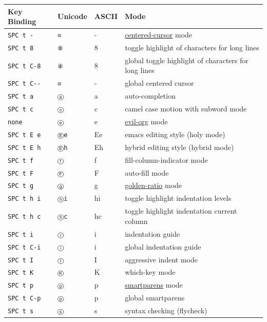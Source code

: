 \documentclass[11pt]{article}
\begin{document}
\begin{enumerate}
\begin{center}
\begin{tabular}{llll}
Key Binding & Unicode & ASCII & Mode\\
\hline
\texttt{SPC t -} & \texttt{⊝} & - & \href{http://emacswiki.org/emacs/centered-cursor-mode.el}{centered-cursor}  mode\\
\texttt{SPC t 8} & \texttt{⑧} & 8 & toggle highlight of characters for long lines\\
\texttt{SPC t C-8} & \texttt{⑧} & 8 & global toggle highlight of characters for long lines\\
\texttt{SPC t C-{}-} & \texttt{⊝} & - & global centered cursor\\
\texttt{SPC t a} & \texttt{ⓐ} & a & auto-completion\\
\texttt{SPC t c} & \texttt{ⓒ} & c & camel case motion with subword mode\\
\texttt{none} & \texttt{ⓔ} & e & \href{https://github.com/edwtjo/evil-org-mode}{evil-org} mode\\
\texttt{SPC t E e} & \texttt{Ⓔe} & Ee & emacs editing style (holy mode)\\
\texttt{SPC t E h} & \texttt{Ⓔh} & Eh & hybrid editing style (hybrid mode)\\
\texttt{SPC t f} & \texttt{ⓕ} & f & fill-column-indicator mode\\
\texttt{SPC t F} & \texttt{Ⓕ} & F & auto-fill mode\\
\texttt{SPC t g} & \texttt{ⓖ} & g & \href{https://github.com/roman/golden-ratio.el}{golden-ratio} mode\\
\texttt{SPC t h i} & \texttt{ⓗi} & hi & toggle highlight indentation levels\\
\texttt{SPC t h c} & \texttt{ⓗc} & hc & toggle highlight indentation current column\\
\texttt{SPC t i} & \texttt{ⓘ} & i & indentation guide\\
\texttt{SPC t C-i} & \texttt{ⓘ} & i & global indentation guide\\
\texttt{SPC t I} & \texttt{Ⓘ} & I & aggressive indent mode\\
\texttt{SPC t K} & \texttt{Ⓚ} & K & which-key mode\\
\texttt{SPC t p} & \texttt{ⓟ} & p & \href{https://github.com/Fuco1/smartparens}{smartparens} mode\\
\texttt{SPC t C-p} & \texttt{ⓟ} & p & global smartparens\\
\texttt{SPC t s} & \texttt{ⓢ} & s & syntax checking (flycheck)\\

\end{tabular}
\end{center}
\end{enumerate}
\end{document}
